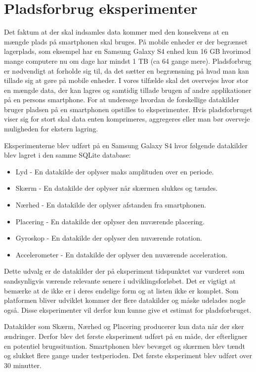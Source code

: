 \section{Pladsforbrug eksperimenter}\label{eksperimenter}
Det faktum at der skal indsamles data kommer med den konsekvens at en mængde plads på smartphonen skal bruges.
På mobile enheder er der begrænset lagerplads, som eksempel har en Samsung Galaxy S4 enhed kun 16 GB hvorimod mange computere nu om dage har mindst 1 TB (ca 64 gange mere).
Pladsforbrug er nødvendigt at forholde sig til, da det sætter en begrænsning på hvad man kan tillade sig at gøre på mobile enheder.
I vores tilfælde skal det overvejes hvor stor en mængde data, der kan lagres og samtidig tillade brugen af andre applikationer på en persons smartphone.
For at undersøge hvordan de forskellige datakilder bruger pladsen på en smartphonen opstilles to eksperimenter.
Hvis pladsforbruget viser sig for stort skal data enten komprimeres, aggregeres eller man bør overveje muligheden for ekstern lagring.

Eksperimenterne blev udført på en Samsung Galaxy S4\cite{misc:samsungs4sensors} hvor følgende datakilder blev lagret i den samme SQLite database:

\begin{itemize}
	\item Lyd - En datakilde der oplyser maks amplituden over en periode.
	\item Skærm - En datakilde der oplyser når skærmen slukkes og tændes.
	\item Nærhed - En datakilde der oplyser afstanden fra smartphonen.
	\item Placering - En datakilde der oplyser den nuværende placering.
	\item Gyroskop - En datakilde der oplyser den nuværende rotation.
	\item Accelerometer - En datakilde der oplyser den nuværende acceleration.
\end{itemize}

Dette udvalg er de datakilder der på eksperiment tidspunktet var vurderet som sandsynligvis værende relevante senere i udviklingsforløbet.
Det er vigtigt at bemærke at de ikke er i deres endelige form og at listen ikke er komplet.
Som platformen bliver udviklet kommer der flere datakilder og måske udelades nogle også.
Disse eksperimenter vil derfor kun kunne give et estimat for pladsforbruget.

Datakilder som Skærm, Nærhed og Placering producerer kun data når der sker ændringer. 
Derfor blev det første eksperiment udført på en måde, der efterligner en potentiel brugssituation. 
Smartphonen blev bevæget og skærmen blev tændt og slukket flere gange under testperioden.
Det første eksperiment blev udført over 30 minutter.

